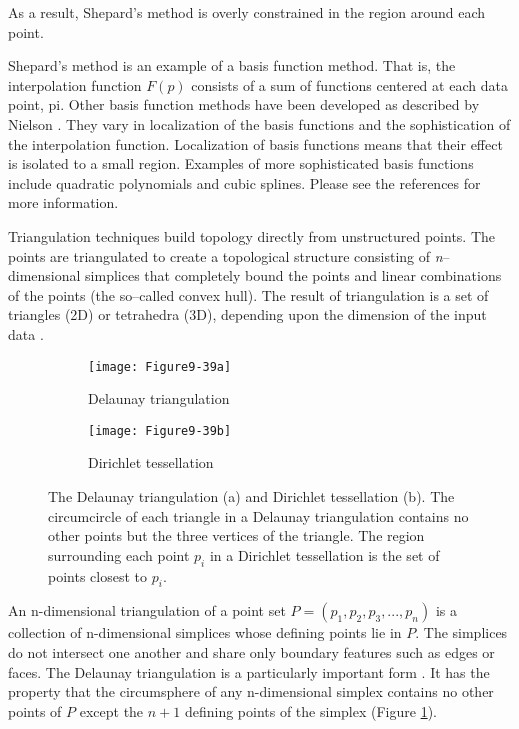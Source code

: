 \begin{description}[leftmargin=0cm,labelindent=0cm]
As a result, Shepard's method is overly constrained in the region around each point.

Shepard's method is an example of a basis function method. That is, the interpolation function $F(p)$ consists of a sum of functions centered at each data point, pi. Other basis function methods have been developed as described by Nielson \cite{Nielson91a}. They vary in localization of the basis functions and the sophistication of the interpolation function. Localization of basis functions means that their effect is isolated to a small region. Examples of more sophisticated basis functions include quadratic polynomials and cubic splines. Please see the references for more information.

\item[Triangulation techniques.]
Triangulation techniques build topology directly from unstructured points. The points are triangulated to create a topological structure consisting of \emph{n}--dimensional simplices that completely bound the points and linear combinations of the points (the so--called convex hull). The result of triangulation is a set of triangles (2D) or tetrahedra (3D), depending upon the dimension of the input data \cite{Lawson86}.

\begin{figure}[htb]
    \centering
	\begin{subfigure}[h]{0.48\linewidth}
		\texttt{[image: Figure9-39a]}
		\captionsetup{justification=centering}
		\caption{Delaunay triangulation}
		\label{fig:Figure9-39a}
	\end{subfigure}
	\hfill
	\begin{subfigure}[h]{0.48\linewidth}
		\texttt{[image: Figure9-39b]}
		\captionsetup{justification=centering}
		\caption{Dirichlet tessellation}
		\label{fig:Figure9-39b}
	\end{subfigure}
	\caption{The Delaunay triangulation (a) and Dirichlet tessellation (b). The circumcircle of each triangle in a Delaunay triangulation contains no other points but the three vertices of the triangle. The region surrounding each point $p_i$ in a Dirichlet tessellation is the set of points closest to $p_i$.}\label{fig:Figure9-39}
\end{figure}

An n-dimensional triangulation of a point set $P = (p_1, p_2, p_3, ..., p_n)$ is a collection of n-dimensional simplices whose defining points lie in $P$. The simplices do not intersect one another and share only boundary features such as edges or faces. The Delaunay triangulation is a particularly important form \cite{Bowyer81} \cite{Watson81}. It has the property that the circumsphere of any n-dimensional simplex contains no other points of $P$ except the $n+1$ defining points of the simplex (Figure \ref{fig:Figure9-39a}).


\end{description}
